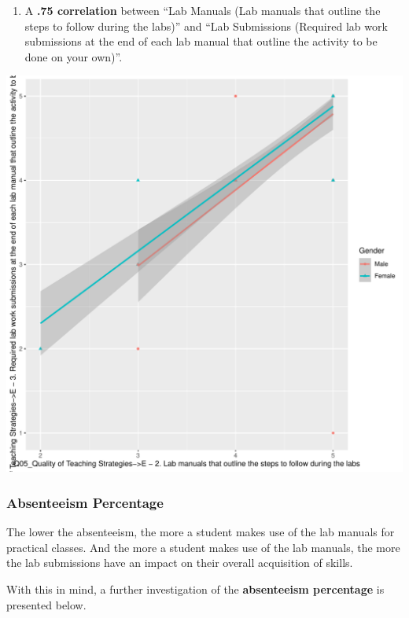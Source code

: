 \documentclass[
]{article}
\providecommand{\tightlist}{%
  \setlength{\itemsep}{0pt}\setlength{\parskip}{0pt}}
\begin{document}
\newpage

\begin{enumerate}
\def\labelenumi{(\arabic{enumi})}
\setcounter{enumi}{1}
\tightlist
\item
  A \textbf{.75 correlation} between ``Lab Manuals (Lab manuals that
  outline the steps to follow during the labs)'' and ``Lab Submissions
  (Required lab work submissions at the end of each lab manual that
  outline the activity to be done on your own)''.
\end{enumerate}

\includegraphics{10.b.BBT4206-End-SemesterCourseEvaluation-20230821-20231128-BI2-BBIT4-2_files/figure-latex/DrillDownCorr2-1.pdf}

\newpage

\subsubsection{Absenteeism Percentage}\label{absenteeism-percentage}

The lower the absenteeism, the more a student makes use of the lab
manuals for practical classes. And the more a student makes use of the
lab manuals, the more the lab submissions have an impact on their
overall acquisition of skills.

With this in mind, a further investigation of the \textbf{absenteeism
percentage} is presented below.
\end{document}
